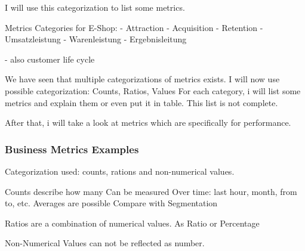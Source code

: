 I will use this categorization to list some metrics.



Metrics Categories for E-Shop:
- Attraction
- Acquisition
- Retention
- Umsatzleistung
- Warenleistung
- Ergebnisleitung

- also customer life cycle







We have seen that multiple categorizations of metrics exists.
I will now use possible categorization: Counts, Ratios, Values
For each category, i will list some metrics and explain them or even put it in table.
This list is not complete.

After that, i will take a look at metrics which are specifically for performance.









\subsubsection{Business Metrics Examples}


Categorization used: counts, rations and non-numerical values.



Counts describe how many
Can be measured Over time: last hour, month, from to, etc.
Averages are possible
Compare with Segmentation



Ratios are a combination of numerical values.
As Ratio or Percentage



Non-Numerical Values can not be reflected as number.


